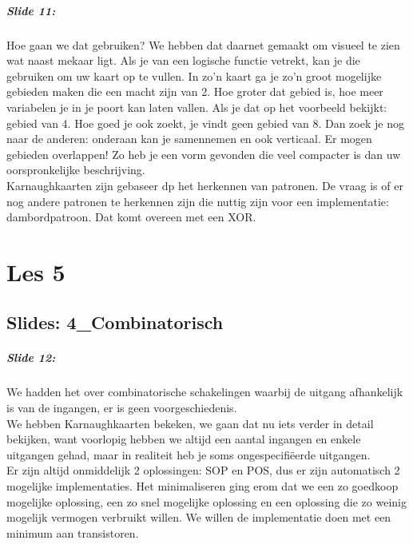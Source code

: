 \documentclass[10pt,a4paper]{book}
\begin{document}
\paragraph{Slide 11:} Hoe gaan we dat gebruiken? We hebben dat daarnet gemaakt om visueel te zien wat naast mekaar ligt. Als je van een logische functie vetrekt, kan je die gebruiken om uw kaart op te vullen. In zo'n kaart ga je zo'n groot mogelijke gebieden maken die een macht zijn van 2. Hoe groter dat gebied is, hoe meer variabelen je in je poort kan laten vallen. Als je dat op het voorbeeld bekijkt: gebied van 4. Hoe goed je ook zoekt, je vindt geen gebied van 8. Dan zoek je nog naar de anderen: onderaan kan je samennemen en ook verticaal. Er mogen gebieden overlappen! Zo heb je een vorm gevonden die veel compacter is dan uw oorspronkelijke beschrijving.\\
Karnaughkaarten zijn gebaseer dp het herkennen van patronen. De vraag is of er nog andere patronen te herkennen zijn die nuttig zijn voor een implementatie: dambordpatroon. Dat komt overeen met een XOR. 

\chapter{Les 5}
\section{Slides: 4\_Combinatorisch}

\paragraph{Slide 12:} We hadden het over combinatorische schakelingen waarbij de uitgang afhankelijk is van de ingangen, er is geen voorgeschiedenis.\\
We hebben Karnaughkaarten bekeken, we gaan dat nu iets verder in detail bekijken, want voorlopig hebben we altijd een aantal ingangen en enkele uitgangen gehad, maar in realiteit heb je soms ongespecifi\"eerde uitgangen. \\
Er zijn altijd onmiddelijk 2 oplossingen: SOP en POS, dus er zijn automatisch 2 mogelijke implementaties. Het minimaliseren ging erom dat we een zo goedkoop mogelijke oplossing, een zo snel mogelijke oplossing en een oplossing die zo weinig mogelijk vermogen verbruikt willen.  We willen de implementatie doen met een minimum aan transistoren.
\end{document}
